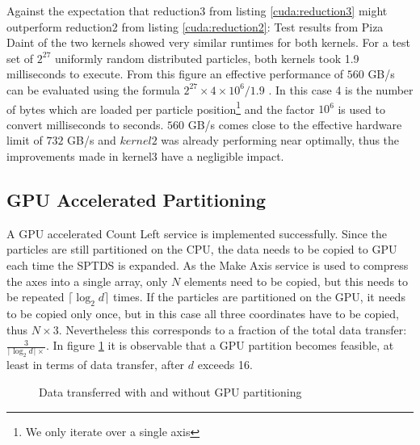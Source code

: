 \documentclass[]{article}
\begin{document}
Against the expectation that reduction3 from listing \ref{cuda:reduction3} might outperform reduction2 from listing \ref{cuda:reduction2}: Test results from Piza Daint of the two kernels showed very similar runtimes for both kernels. For a test set of $2^{27}$ uniformly random distributed particles, both kernels took 1.9 milliseconds to execute. From this figure an effective performance of $560$ GB/s can be evaluated using the formula $2^{27}\times 4 \times 10^6 / 1.9$ \cite{metrics}. In this case 4 is the number of bytes which are loaded per particle position\footnote{We only iterate over a single axis} and the factor $10^6$ is used to convert milliseconds to seconds. 
$560$ GB/s comes close to the effective hardware limit of $732$ GB/s and $kernel2$ was already performing near optimally, thus the improvements made in kernel3 have a negligible impact. 

\subsection{GPU Accelerated Partitioning}

A GPU accelerated Count Left service is implemented successfully. Since the particles are still partitioned on the CPU, the data needs to be copied to GPU each time the SPTDS is expanded. As the Make Axis service is used to compress the axes into a single array, only $N$ elements need to be copied, but this needs to be repeated $\lceil \log_2 d \rceil$ times. 
If the particles are partitioned on the GPU, it needs to be copied only once, but in this case all three coordinates have to be copied, thus $
N \times 3$. Nevertheless this corresponds to a fraction of the total data transfer: $\frac{3}{\lceil \log_2 d \rceil \times}$. In figure \ref{fig:transfer} it is observable that a GPU partition becomes feasible, at least in terms of data transfer, after $d$ exceeds 16. 

\begin{figure}[H]
	\begin{center}
		\caption{Data transferred with and without GPU partitioning}
		\label{fig:transfer}
	\end{center}
\end{figure}
\end{document}
